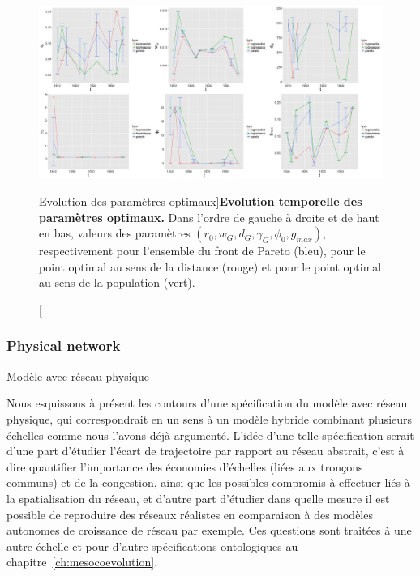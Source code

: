 \begin{figure}
	\includegraphics[width=\linewidth]{Figures/Final/6-2-3-fig-macrocoevol-parameters.jpg}
	\caption[Evolution of optimal parameters][Evolution des paramètres optimaux]{\label{fig:macrocoevol:parameters}}{\textbf{Evolution temporelle des paramètres optimaux.} Dans l'ordre de gauche à droite et de haut en bas, valeurs des paramètres $(r_0,w_G,d_G,\gamma_G,\phi_0,g_{max})$, respectivement pour l'ensemble du front de Pareto (bleu), pour le point optimal au sens de la distance (rouge) et pour le point optimal au sens de la population (vert).\label{fig:macrocoevol:parameters}}
\end{figure}








\subsubsection{Physical network}{Modèle avec réseau physique}


Nous esquissons à présent les contours d'une spécification du modèle avec réseau physique, qui correspondrait en un sens à un modèle hybride combinant plusieurs échelles comme nous l'avons déjà argumenté. L'idée d'une telle spécification serait d'une part d'étudier l'écart de trajectoire par rapport au réseau abstrait, c'est à dire quantifier l'importance des économies d'échelles (liées aux tronçons communs) et de la congestion, ainsi que les possibles compromis à effectuer liés à la spatialisation du réseau, et d'autre part d'étudier dans quelle mesure il est possible de reproduire des réseaux réalistes en comparaison à des modèles autonomes de croissance de réseau par exemple. Ces questions sont traitées à une autre échelle et pour d'autre spécifications ontologiques au chapitre~\ref{ch:mesocoevolution}. 


